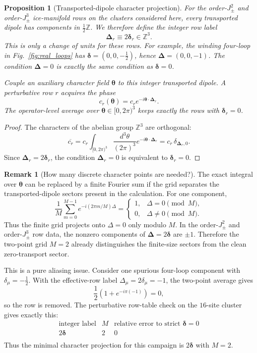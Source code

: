 \documentclass[11pt,letterpaper]{article}
\newcommand{\Jpm}{J_{\pm}}
\newcommand{\bdelta}{\bm \delta}
\newcommand{\bDelta}{\bm \Delta}
\newcommand{\btheta}{\bm \theta}
\newcommand{\Z}{\mathbb Z}
\theoremstyle{plain}
\newtheorem{proposition}{Proposition}
\theoremstyle{definition}
\newtheorem{remark}{Remark}
\begin{document}
\begin{proposition}[Transported-dipole character projection]
For the order-$\Jpm^2$ and order-$\Jpm^3$ ice-manifold rows on the clusters
considered here, every transported dipole has components in $\frac12\Z$.  We
therefore define the integer row label
\begin{equation}
\boxed{\bDelta_r\equiv2\bdelta_r\in\Z^3.}
\label{eq:Delta_integer_label}
\end{equation}
This is only a change of units for these rows.  For example, the winding four-loop in
Fig.~\ref{fig:real_loops} has
$\bdelta=(0,0,-\tfrac12)$, hence $\bDelta=(0,0,-1)$.  The condition
$\bDelta=0$ is exactly the same condition as $\bdelta=0$.

Couple an auxiliary character field $\btheta$ to this integer transported
dipole.  A perturbative row $r$ acquires the phase
\begin{equation}
c_r(\btheta)=c_r e^{-i\btheta\cdot\bDelta_r}.
\label{eq:delta_character_phase}
\end{equation}
The operator-level average over $\btheta\in[0,2\pi)^3$ keeps exactly the rows
with $\bdelta_r=0$.
\end{proposition}

\begin{proof}
The characters of the abelian group $\Z^3$ are orthogonal:
\[
\overline{c_r}
=c_r\int_{[0,2\pi)^3}\frac{d^3\theta}{(2\pi)^3}
e^{-i\btheta\cdot\bDelta_r}
=c_r\,\delta_{\bDelta_r,0}.
\]
Since $\bDelta_r=2\bdelta_r$, the condition $\bDelta_r=0$ is equivalent to
$\bdelta_r=0$.
\end{proof}

\begin{remark}[How many discrete character points are needed?]
The exact integral over $\btheta$ can be replaced by a finite Fourier sum if
the grid separates the transported-dipole sectors present in the calculation.
For one component,
\[
\frac1M\sum_{m=0}^{M-1}
e^{-i(2\pi m/M)\Delta}
=
\begin{cases}
1,& \Delta=0\pmod M,\\
0,& \Delta\ne0\pmod M.
\end{cases}
\]
Thus the finite grid projects onto $\Delta=0$ only modulo $M$.  In the
order-$\Jpm^2$ and order-$\Jpm^3$ row data, the nonzero components of
$\bDelta=2\bdelta$ are $\pm1$.  Therefore the two-point grid $M=2$ already
distinguishes the finite-size sectors from the clean zero-transport sector.

This is a pure aliasing issue.  Consider one spurious four-loop component with
$\delta_\mu=-\frac12$.  With the effective-row label
$\Delta_\mu=2\delta_\mu=-1$, the two-point average gives
\[
\frac12\left(1+e^{-i\pi(-1)}\right)=0,
\]
so the row is removed.  The perturbative row-table check on the $16$-site
cluster gives exactly this:
\[
\begin{array}{c|c|c}
\text{integer label} & M & \text{relative error to strict }\bdelta=0\\
\hline
2\bdelta & 2 & 0\\
\end{array}
\]
Thus the minimal character projection for this campaign is $2\bdelta$ with
$M=2$.
\end{remark}
\end{document}
